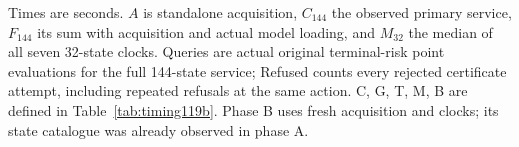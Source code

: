 \noindent Times are seconds. $A$ is standalone acquisition, $C_{144}$ the observed primary service, $F_{144}$ its sum with acquisition and actual model loading, and $M_{32}$ the median of all seven 32-state clocks. Queries are actual original terminal-risk point evaluations for the full 144-state service; Refused counts every rejected certificate attempt, including repeated refusals at the same action. C, G, T, M, B are defined in Table~\ref{tab:timing119b}. Phase B uses fresh acquisition and clocks; its state catalogue was already observed in phase A.
\endgroup

